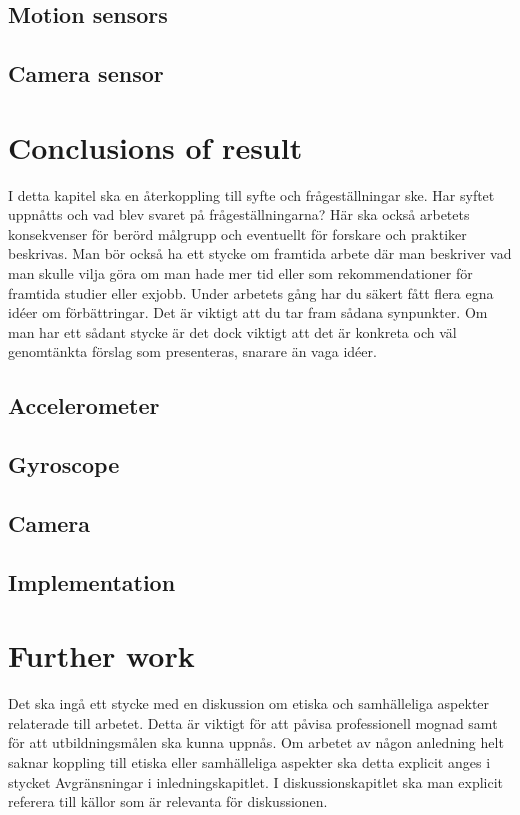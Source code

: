\subsection{Motion sensors}
\subsection{Camera sensor}


\section{Conclusions of result}\label{sec:conclusion}
I detta kapitel ska en återkoppling till syfte och frågeställningar ske. Har syftet uppnåtts
och vad blev svaret på frågeställningarna? Här ska också arbetets konsekvenser för
berörd målgrupp och eventuellt för forskare och praktiker beskrivas.
Man bör också ha ett stycke om framtida arbete där man beskriver vad man skulle vilja
göra om man hade mer tid eller som rekommendationer för framtida studier eller exjobb.
Under arbetets gång har du säkert fått flera egna idéer om förbättringar. Det är viktigt att
du tar fram sådana synpunkter. Om man har ett sådant stycke är det dock viktigt att det är
konkreta och väl genomtänkta förslag som presenteras, snarare än vaga idéer.
\subsection{Accelerometer}
\subsection{Gyroscope}
\subsection{Camera}
\subsection{Implementation}

\section{Further work}
Det ska ingå ett stycke med en diskussion om etiska och samhälleliga aspekter relaterade
till arbetet. Detta är viktigt för att påvisa professionell mognad samt för att utbildningsmålen
ska kunna uppnås. Om arbetet av någon anledning helt saknar koppling till etiska eller
samhälleliga aspekter ska detta explicit anges i stycket Avgränsningar i inledningskapitlet.
I diskussionskapitlet ska man explicit referera till källor som är relevanta för diskussionen.